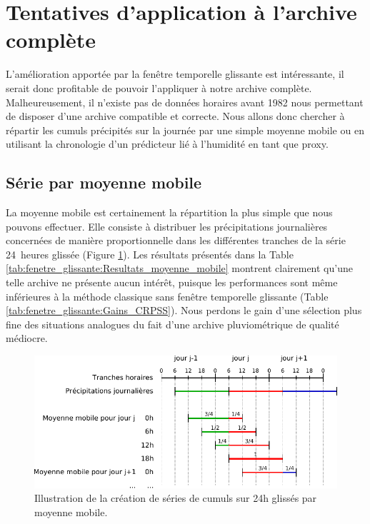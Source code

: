 \documentclass[hess]{copernicus}
\begin{document}
\section{Tentatives d'application à l'archive complète}

L'amélioration apportée par la fenêtre temporelle glissante est intéressante, il serait donc profitable de pouvoir l'appliquer à notre archive complète. Malheureusement, il n'existe pas de données horaires avant 1982 nous permettant de disposer d'une archive compatible et correcte. Nous allons donc chercher à répartir les cumuls précipités sur la journée par une simple moyenne mobile ou en utilisant la chronologie d'un prédicteur lié à l'humidité en tant que proxy.

\subsection{Série par moyenne mobile}

La moyenne mobile est certainement la répartition la plus simple que nous pouvons effectuer. Elle consiste à distribuer les précipitations journalières concernées de manière proportionnelle dans les différentes tranches de la série 24~heures glissée (Figure \ref{fig:Illustration_series_6h_moyennes_mobiles}). Les résultats présentés dans la Table \ref{tab:fenetre_glissante:Resultats_moyenne_mobile} montrent clairement qu'une telle archive ne présente aucun intérêt, puisque les performances sont même inférieures à la méthode classique sans fenêtre temporelle glissante (Table \ref{tab:fenetre_glissante:Gains_CRPSS}). Nous perdons le gain d'une sélection plus fine des situations analogues du fait d'une archive pluviométrique de qualité médiocre.

\begin{figure}[htb]
	\begin{center}
		\includegraphics[width=12cm]{figures/Illustration_series_6h_moyennes_mobiles.pdf}
	\end{center}
	\caption{Illustration de la création de séries de cumuls sur 24h glissés par moyenne mobile.}
	\label{fig:Illustration_series_6h_moyennes_mobiles}
\end{figure}
\end{document}
